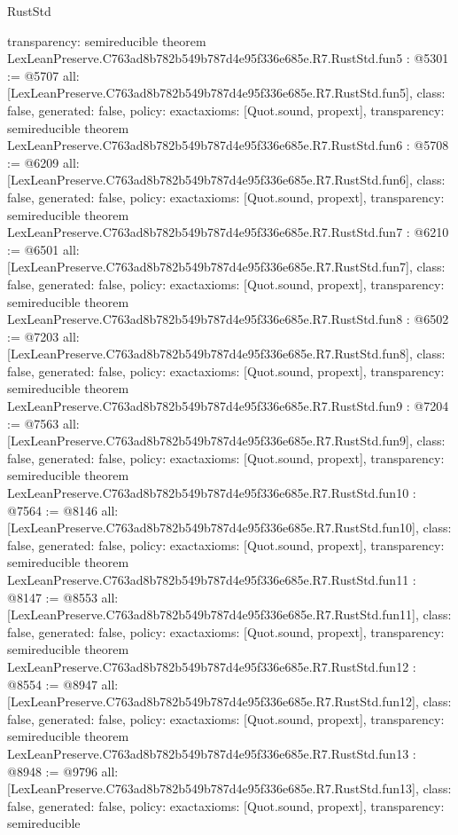 \begin{lexlean}{RustStd}
\begin{coremodule}
{  transparency: semireducible
}
theorem LexLeanPreserve.C763ad8b782b549b787d4e95f336e685e.R7.RustStd.fun5 : @5301 := @5707 {
  all: [LexLeanPreserve.C763ad8b782b549b787d4e95f336e685e.R7.RustStd.fun5],
  class: false,
  generated: false,
  policy: exact{axioms: [Quot.sound, propext]},
  transparency: semireducible
}
theorem LexLeanPreserve.C763ad8b782b549b787d4e95f336e685e.R7.RustStd.fun6 : @5708 := @6209 {
  all: [LexLeanPreserve.C763ad8b782b549b787d4e95f336e685e.R7.RustStd.fun6],
  class: false,
  generated: false,
  policy: exact{axioms: [Quot.sound, propext]},
  transparency: semireducible
}
theorem LexLeanPreserve.C763ad8b782b549b787d4e95f336e685e.R7.RustStd.fun7 : @6210 := @6501 {
  all: [LexLeanPreserve.C763ad8b782b549b787d4e95f336e685e.R7.RustStd.fun7],
  class: false,
  generated: false,
  policy: exact{axioms: [Quot.sound, propext]},
  transparency: semireducible
}
theorem LexLeanPreserve.C763ad8b782b549b787d4e95f336e685e.R7.RustStd.fun8 : @6502 := @7203 {
  all: [LexLeanPreserve.C763ad8b782b549b787d4e95f336e685e.R7.RustStd.fun8],
  class: false,
  generated: false,
  policy: exact{axioms: [Quot.sound, propext]},
  transparency: semireducible
}
theorem LexLeanPreserve.C763ad8b782b549b787d4e95f336e685e.R7.RustStd.fun9 : @7204 := @7563 {
  all: [LexLeanPreserve.C763ad8b782b549b787d4e95f336e685e.R7.RustStd.fun9],
  class: false,
  generated: false,
  policy: exact{axioms: [Quot.sound, propext]},
  transparency: semireducible
}
theorem LexLeanPreserve.C763ad8b782b549b787d4e95f336e685e.R7.RustStd.fun10 : @7564 := @8146 {
  all: [LexLeanPreserve.C763ad8b782b549b787d4e95f336e685e.R7.RustStd.fun10],
  class: false,
  generated: false,
  policy: exact{axioms: [Quot.sound, propext]},
  transparency: semireducible
}
theorem LexLeanPreserve.C763ad8b782b549b787d4e95f336e685e.R7.RustStd.fun11 : @8147 := @8553 {
  all: [LexLeanPreserve.C763ad8b782b549b787d4e95f336e685e.R7.RustStd.fun11],
  class: false,
  generated: false,
  policy: exact{axioms: [Quot.sound, propext]},
  transparency: semireducible
}
theorem LexLeanPreserve.C763ad8b782b549b787d4e95f336e685e.R7.RustStd.fun12 : @8554 := @8947 {
  all: [LexLeanPreserve.C763ad8b782b549b787d4e95f336e685e.R7.RustStd.fun12],
  class: false,
  generated: false,
  policy: exact{axioms: [Quot.sound, propext]},
  transparency: semireducible
}
theorem LexLeanPreserve.C763ad8b782b549b787d4e95f336e685e.R7.RustStd.fun13 : @8948 := @9796 {
  all: [LexLeanPreserve.C763ad8b782b549b787d4e95f336e685e.R7.RustStd.fun13],
  class: false,
  generated: false,
  policy: exact{axioms: [Quot.sound, propext]},
  transparency: semireducible
}
\end{coremodule}
\end{lexlean}
